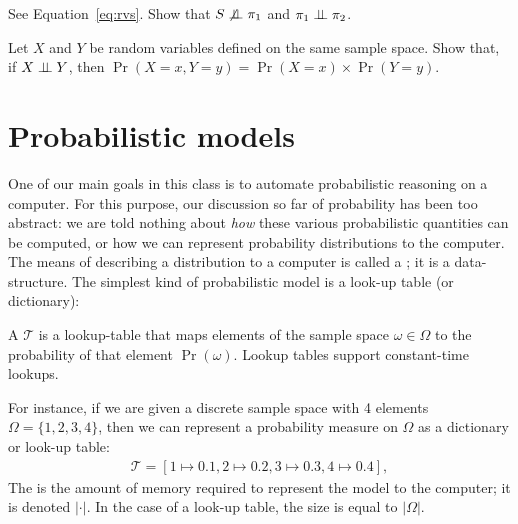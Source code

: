 \documentclass{tufte-handout}
\begin{document}
\begin{exercise}[$\star$]
    See Equation~\ref{eq:rvs}. Show that $S \not \perp \!\!\! \perp \pi_1$ and $\pi_1 \perp \!\!\! \perp \pi_2$. 
\end{exercise}

\begin{exercise}[$\star$]
    Let $X$ and $Y$ be random variables defined on the same sample space. Show 
    that, if $X \perp \!\!\! \perp Y$, then $\Pr(X = x, Y = y) = \Pr(X = x) \times \Pr(Y = y)$.
\end{exercise}

\section{Probabilistic models}
One of our main goals in this class is to automate probabilistic reasoning on a
computer.  For this purpose, our discussion so far of probability has been too
abstract: we are told nothing about \emph{how} these various probabilistic
quantities can be computed, or how we can represent probability distributions to
the computer. The means of describing a distribution to a computer is called a
; it is a data-structure. The simplest kind of
probabilistic model is a look-up table (or dictionary):
\begin{definition}
    A  $\mathcal{T}$ is a lookup-table that maps
    elements of the sample space $\omega \in \Omega$ to the probability of that
    element $\Pr(\omega)$. 
    Lookup tables support constant-time lookups.
\end{definition}

For instance, if we are given a discrete sample space with 4 
elements $\Omega = \{1, 2, 3, 4\}$, then we can represent a
probability measure on $\Omega$ as 
a dictionary or look-up table:
\begin{align}
    \mathcal{T} = [1 \mapsto 0.1, 2 \mapsto 0.2, 3 \mapsto 0.3, 4 \mapsto 0.4],
\end{align}
The  is the amount of memory required to represent the model to the 
computer; it is denoted $|\cdot|$. In the case of a look-up table, the size is 
equal to $|\Omega|$.
\end{document}
